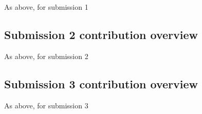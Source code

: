 \documentclass[a4paper, 11pt]{report}
\begin{document}
As above, for submission 1

\subsection{Submission 2 contribution overview}

As above, for submission 2

\subsection{Submission 3 contribution overview}

As above, for submission 3



\newpage



\end{document}
